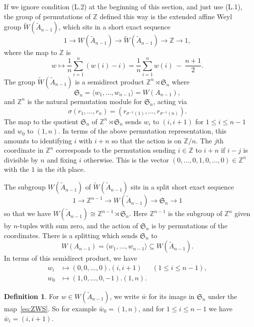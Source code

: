 \documentclass[12pt]{amsart}
\renewcommand{\le}{\leqslant}
\newcommand{\sym}[1]{\mathfrak{S}_{#1}}
\newcommand{\bZ}{{\mathbb{Z}}}
\numberwithin{equation}{section}
\theoremstyle{definition}
\newtheorem{definition}[equation]{Definition}
\begin{document}
If we ignore condition (L.2) at the beginning of this section, and
just use (L.1),
the group of permutations of $\bZ$ defined this way is the extended
affine Weyl group 
$\tilde W(\tilde A_{n-1})$, which sits in a short exact sequence
\[ 1 \to W(\tilde A_{n-1})\to \tilde W(\tilde A_{n-1}) \to\bZ\to 1, \]
where the map to $\bZ$ is 
\[ w\mapsto \frac{1}{n}\sum_{i=1}^n(w(i)-i)= 
\frac{1}{n}\sum_{i=1}^{n} w(i)\ -\ \frac{n+1}{2}. \]
The group $\tilde W(\tilde A_{n-1})$ is a semidirect product
$\bZ^{n}\rtimes\sym{n}$ where 
\[ \sym{n}=\langle w_1,\dots,w_{n-1}\rangle=W(A_{n-1}), \] 
and $\bZ^n$ is the
natural permutation module for $\sym{n}$, acting via
\begin{equation}\label{eq:action}
\sigma(r_1,\dots,r_n)=(r_{\sigma^{-1}(1)},\dots,r_{\sigma^{-1}(n)}). 
\end{equation} The map to the quotient
$\sym{n}$ of $\bZ^n\rtimes\sym{n}$ sends $w_i$ to $(i,i+1)$ for $1\le i\le n-1$ and $w_0$ to $(1,n)$. 
In terms of the above permutation representation, this amounts to   
identifying $i$ with $i+n$ so that the action is on $\bZ/n$.  
 The $j$th coordinate in $\bZ^n$ corresponds to the permutation sending $i\in\bZ$ to $i+n$ if
$i-j$ is divisible by $n$ and fixing $i$ otherwise. This is the vector
$(0,\dots,0,1,0,\dots,0)\in\bZ^n$ with the $1$ in the $i$th place.

The
subgroup $W(\tilde A_{n-1})$ of $\tilde W(\tilde A_{n-1})$ sits in a
split short exact sequence
\begin{equation}\label{eq:ZWS}
1\to \bZ^{n-1} \to W(\tilde A_{n-1}) \to \sym{n} \to 1
\end{equation}
so that we have $W(\tilde A_{n-1})\cong\bZ^{n-1}\rtimes\sym{n}$. Here  
$\bZ^{n-1}$ is the subgroup of $\bZ^n$ given by $n$-tuples with sum
zero, and the action of $\sym{n}$ is by permutations of the
coordinates. There is a splitting which sends $\sym{n}$ to
\begin{equation}\label{eq:WAn-1}
 W(A_{n-1})=\langle w_1,\dots,w_{n-1}\rangle\subseteq W(\tilde
  A_{n-1}). 
\end{equation}
In terms of this semidirect product, we have
\begin{align*} 
w_i& \mapsto (0,0,\dots,0).(i,i+1)& (1\le i\le n-1),\\ 
w_0&\mapsto (1,0,\dots,0,-1).(1,n). 
\end{align*}

\begin{definition}\label{def:wbar}
For $w\in W(\tilde A_{n-1})$, we write $\bar w$ for its image in
$\sym{n}$ under the map~\eqref{eq:ZWS}. So for example $\bar
w_0=(1,n)$, and for $1\le i\le n-1$ we have $\bar w_i=(i,i+1)$.
\end{definition}
\end{document}
